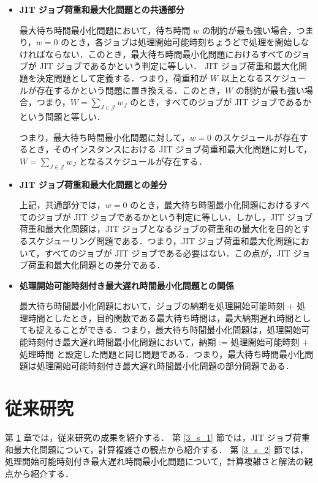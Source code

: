 \documentclass[12pt]{optlab-bachelor}
\begin{document}
\begin{itemize}
  \item \textbf{JIT ジョブ荷重和最大化問題との共通部分}

  最大待ち時間最小化問題において，待ち時間 $w$ の制約が最も強い場合，つまり，$w = 0$ のとき，各ジョブは処理開始可能時刻ちょうどで処理を開始しなければならない．このとき，最大待ち時間最小化問題におけるすべてのジョブが JIT ジョブであるかという判定に等しい．
  JIT ジョブ荷重和最大化問題を決定問題として定義する．つまり，荷重和が $W$ 以上となるスケジュールが存在するかという問題に置き換える．このとき，$W$ の制約が最も強い場合，つまり，$W = {\displaystyle \sum_{J \in \mathcal{J}}w_J}$ のとき，すべてのジョブが JIT  ジョブであるかという問題と等しい．

  つまり，最大待ち時間最小化問題に対して，$w = 0$ のスケジュールが存在するとき，そのインスタンスにおける JIT ジョブ荷重和最大化問題に対して，$W = {\displaystyle \sum_{J \in \mathcal{J}}w_J}$ となるスケジュールが存在する．

  \item \textbf{JIT ジョブ荷重和最大化問題との差分}

  上記，共通部分では，$w = 0$ のとき，最大待ち時間最小化問題におけるすべてのジョブが JIT ジョブであるかという判定に等しい．しかし，JIT ジョブ荷重和最大化問題は，JIT ジョブとなるジョブの荷重和の最大化を目的とするスケジューリング問題である．つまり，JIT ジョブ荷重和最大化問題において，すべてのジョブが JIT ジョブである必要はない．この点が，JIT ジョブ荷重和最大化問題との差分である．

  \item \textbf{処理開始可能時刻付き最大遅れ時間最小化問題との関係}

  最大待ち時間最小化問題において，ジョブの納期を処理開始可能時刻 + 処理時間としたとき，目的関数である最大待ち時間は，最大納期遅れ時間としても捉えることができる．つまり，最大待ち時間最小化問題は，処理開始可能時刻付き最大遅れ時間最小化問題において，納期 := 処理開始可能時刻 + 処理時間 と設定した問題と同じ問題である．つまり，最大待ち時間最小化問題は処理開始可能時刻付き最大遅れ時間最小化問題の部分問題である．

\end{itemize}

\chapter{従来研究}\label{c_3}
第 \ref{c_3} 章では，従来研究の成果を紹介する．
第 \ref{3_s_1} 節では，JIT ジョブ荷重和最大化問題について，計算複雑さの観点から紹介する．
第 \ref{3_s_2} 節では，処理開始可能時刻付き最大遅れ時間最小化問題について，計算複雑さと解法の観点から紹介する．
\end{document}
